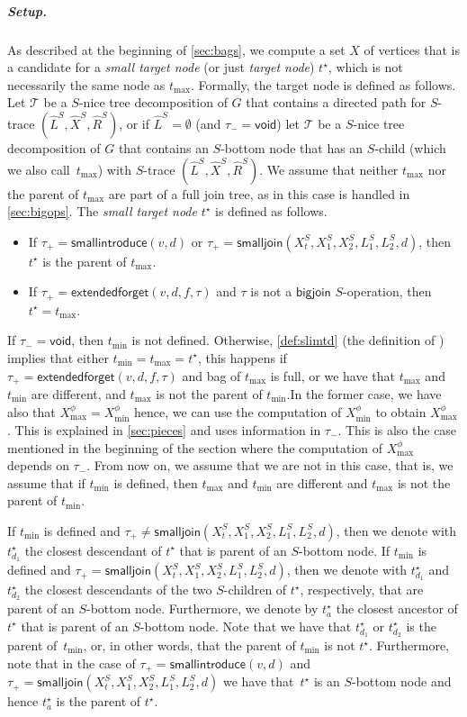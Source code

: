 \documentclass[a4paper,UKenglish,cleveref, autoref, thm-restate, numberwithinsect]{lipics-v2021}
\newcommand{\bigjoin}{\mathsf{bigjoin}}
\newcommand{\smallintroduce}{\mathsf{smallintroduce}}
\newcommand{\smalljoin}{\mathsf{smalljoin}}
\newcommand{\extendedforget}{\mathsf{extendedforget}}
\newcommand{\void}{\mathsf{void}}
\newcommand{\slim}{\text{slim}\xspace}
\begin{document}
\subparagraph{Setup.} As described at the beginning of \cref{sec:bags}, we compute a set $X$ of vertices that is a candidate for a \emph{small target node} (or just \emph{target node}) ${t^\star}$, which is not necessarily the same node as $t_{\max}$. Formally, the target node is defined as follows.
Let $\mathcal{T}$ be a \slim $S$-nice tree decomposition of $G$ that contains a directed path for $S$-trace $(\hat{L}^S, \hat{X}^S, \hat{R}^S)$, or if $\hat{L}^S=\emptyset$ (and $\tau_-=\void$) let $\mathcal{T}$ be a \slim $S$-nice tree decomposition of $G$ that contains an $S$-bottom node that has an $S$-child (which we also call~$t_{\max}$) with $S$-trace $(\hat{L}^S, \hat{X}^S, \hat{R}^S)$.
We assume that neither $t_{\max}$ nor the parent of $t_{\max}$ are part of a full join tree, as in this case is handled in \cref{sec:bigops}.
The \emph{small target node} ${t^\star}$ is defined as follows.
\begin{itemize}
\item If $\tau_+=\smallintroduce(v,d)$ or $\tau_+=\smalljoin(X^S_t,X_1^S,X_2^S,L_{1}^S, L_{2}^S,d)$, then ${t^\star}$ is the parent of $t_{\max}$.
\item If $\tau_+=\extendedforget(v,d,f,\tau)$ and $\tau$ is not a $\bigjoin$ $S$-operation, then ${t^\star}=t_{\max}$.
\end{itemize}

If $\tau_-=\void$, then $t_{\min}$ is not defined.
Otherwise, \cref{def:slimtd} (the definition of \slim) implies that either $t_{\min}=t_{\max}=t^{\star}$, this happens if $\tau_+=\extendedforget(v,d,f,\tau)$ and bag of $t_{\max}$ is full, or we have that $t_{\max}$ and $t_{\min}$ are different, and $t_{\max}$ is not the parent of $t_{\min}$.In the former case, we have also that $X^\phi_{\max}=X^\phi_{\min}$ hence, we can use the computation of $X^\phi_{\min}$ to obtain $X^\phi_{\max}$. This is explained in \cref{sec:pieces} and uses information in $\tau_-$. This is also the case mentioned in the beginning of the section where the computation of $X^\phi_{\max}$ depends on $\tau_-$.
From now on, we assume that we are not in this case, that is, we assume that if $t_{\min}$ is defined, then $t_{\max}$ and $t_{\min}$ are different and $t_{\max}$ is not the parent of $t_{\min}$.

If $t_{\min}$ is defined and $\tau_+\neq\smalljoin(X^S_t,X_1^S,X_2^S,L_{1}^S, L_{2}^S,d)$, then we denote with $t^{\star}_{d_1}$ the closest descendant of $t^\star$ that is parent of an $S$-bottom node. 
If $t_{\min}$ is defined and $\tau_+=\smalljoin(X^S_t,X_1^S,X_2^S,L_{1}^S, L_{2}^S,d)$, then we denote with $t^{\star}_{d_1}$ and $t^{\star}_{d_2}$ the closest descendants of the two $S$-children of $t^\star$, respectively, that are parent of an $S$-bottom node. 
Furthermore, we denote by $t^{\star}_a$ the closest ancestor of $t^\star$ that is parent of an $S$-bottom node. Note that we have that $t^{\star}_{d_1}$ or $t^{\star}_{d_2}$ is the parent of~$t_{\min}$, or, in other words, that the parent of $t_{\min}$ is not $t^\star$. Furthermore, note that in the case of $\tau_+=\smallintroduce(v,d)$ and $\tau_+=\smalljoin(X^S_t,X_1^S,X_2^S,L_{1}^S, L_{2}^S,d)$ we have that~$t^\star$ is an $S$-bottom node and hence $t^{\star}_a$ is the parent of $t^\star$.  
\end{document}

